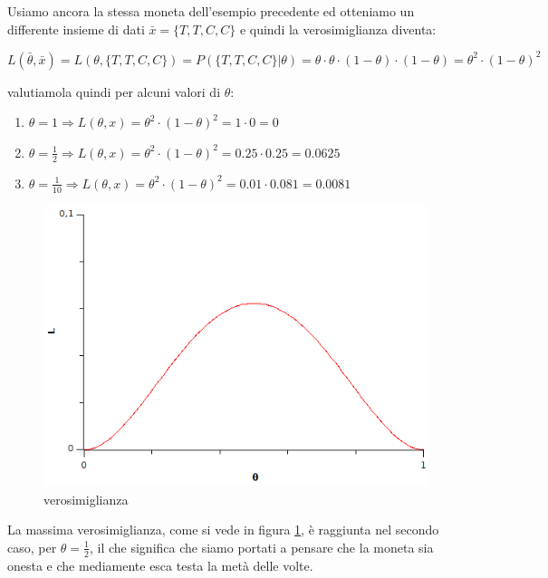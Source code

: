 \begin{esempio} %
Usiamo ancora la stessa moneta dell'esempio precedente ed otteniamo un differente insieme di dati $\bar{x}=\{T,T,C,C\}$ e quindi la verosimiglianza diventa:

    \[ L(\bar{\theta},\bar{x})=L(\theta,\{T,T,C,C\})=P(\{T,T,C,C\}|\theta)=\theta \cdot \theta \cdot (1-\theta) \cdot (1-\theta) = \theta^2 \cdot (1-\theta)^2 \]

valutiamola quindi per alcuni valori di $\theta$:

\begin{enumerate}
  \item $\theta=1  \Rightarrow L(\theta,x)=\theta^2 \cdot (1-\theta)^2=1 \cdot 0=0$
  \item $\theta=\frac{1}{2}  \Rightarrow L(\theta,x)=\theta^2 \cdot (1-\theta)^2=0.25 \cdot 0.25=0.0625$
  \item $\theta=\frac{1}{10}  \Rightarrow L(\theta,x)=\theta^2 \cdot (1-\theta)^2=0.01 \cdot 0.081=0.0081$
\end{enumerate}

  \begin{figure}[htbp]
    \centering
    \includegraphics[scale=0.5]{img/verosim2.png} 
    \caption{verosimiglianza\label{fig:verosim2}}
  \end{figure}
La massima verosimiglianza, come si vede in figura \ref{fig:verosim2}, è raggiunta nel secondo caso, per $\theta=\frac{1}{2}$, il che significa che siamo portati a pensare che la moneta sia onesta e che mediamente esca testa la metà delle volte.
\end{esempio}

